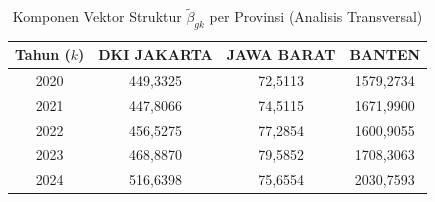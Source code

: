 \begin{table}[H]
\centering
\small
\caption{Komponen Vektor Struktur $\tilde{\beta}_{gk}$ per Provinsi (Analisis Transversal)} \label{tab:beta_provinsi}
\begin{tabular}{|c|c|c|c|}
\hline
\textbf{Tahun ($k$)} & \textbf{DKI JAKARTA} & \textbf{JAWA BARAT} & \textbf{BANTEN} \\
\hline
2020 & 449,3325 & 72,5113 & 1579,2734 \\
2021 & 447,8066 & 74,5115 & 1671,9900 \\
2022 & 456,5275 & 77,2854 & 1600,9055 \\
2023 & 468,8870 & 79,5852 & 1708,3063 \\
2024 & 516,6398 & 75,6554 & 2030,7593 \\
\hline
\end{tabular}
\end{table}